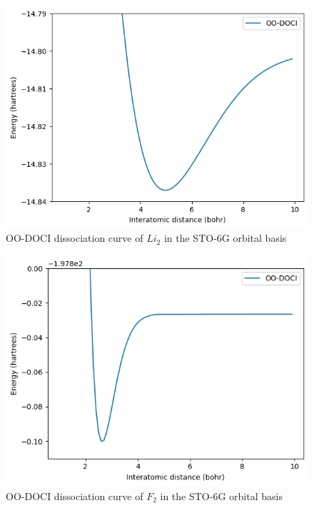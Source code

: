 \documentclass[twoside,twocolumn,9pt]{article}
\begin{document}
\begin{figure}
  \includegraphics[width=\linewidth]{Li2.png}
  \caption{OO-DOCI dissociation curve of $Li_2$ in the STO-6G orbital basis}\label{Li2}
\end{figure}

\begin{figure}
  \includegraphics[width=\linewidth]{F2.png}
  \caption{OO-DOCI dissociation curve of $F_2$ in the STO-6G orbital basis}\label{F2}
\end{figure}
\end{document}
